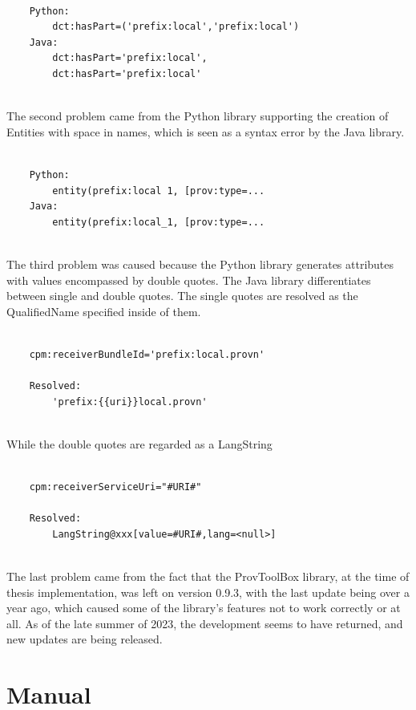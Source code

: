 \documentclass[
  digital,     %
  oneside,     %
  nosansbold,  %
  nocolorbold, %
  lof,         %
  lot,         %
]{fithesis4}
\begin{document}
\begin{verbatim}

    Python: 
        dct:hasPart=('prefix:local','prefix:local')
    Java:
        dct:hasPart='prefix:local', 
        dct:hasPart='prefix:local' 
        
\end{verbatim}

The second problem came from the Python library supporting the creation of Entities with space in names, which is seen as a syntax error by the Java library.

\begin{verbatim}

    Python:
        entity(prefix:local 1, [prov:type=...
    Java:
        entity(prefix:local_1, [prov:type=... 
        
\end{verbatim}

The third problem was caused because the Python library generates attributes with values encompassed by double quotes. The Java library differentiates between single and double quotes. The single quotes are resolved as the QualifiedName specified inside of them.

\begin{verbatim}

    cpm:receiverBundleId='prefix:local.provn'
    
    Resolved:
        'prefix:{{uri}}local.provn'
        
\end{verbatim}

While the double quotes are regarded as a LangString

\begin{verbatim}

    cpm:receiverServiceUri="#URI#"
    
    Resolved:
        LangString@xxx[value=#URI#,lang=<null>]
        
\end{verbatim}

The last problem came from the fact that the ProvToolBox library, at the time of thesis implementation, was left on version 0.9.3, with the last update being over a year ago, which caused some of the library's features not to work correctly or at all. As of the late summer of 2023, the development seems to have returned, and new updates are being released.
\shorthandon{-}


\chapter{Manual}
\shorthandoff{-}
\end{document}
